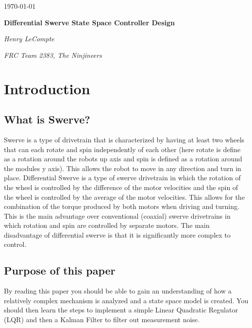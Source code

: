 \documentclass{scrartcl}
\begin{document}
\begin{titlepage}
    \centering
    {\large \today\par}
    \vfill

    {\huge\bfseries Differential Swerve State Space Controller Design\par}
    \vfill

    {\Large\itshape Henry LeCompte}\par
    {\itshape FRC Team 2383, The Ninjineers}\par
    \vspace{1.5cm}

    \vfill
\end{titlepage}

\newpage

\doublespacing
\tableofcontents
\singlespacing

\newpage

\doublespacing

\section{Introduction}
\subsection{What is Swerve?}
Swerve is a type of drivetrain that is characterized by having at least two wheels that can each rotate and spin independently of each other (here rotate is define as a rotation around the robots up axis and spin is defined as a rotation around the modules y axis). This allows the robot to move in any direction and turn in place. Differential Swerve is a type of swerve drivetrain in which the rotation of the wheel is controlled by the difference of the motor velocities and the spin of the wheel is controlled by the average of the motor velocities. This allows for the combination of the torque produced by both motors when driving and turning. This is the main advantage over conventional (coaxial) swerve drivetrains in which rotation and spin are controlled by separate motors. The main disadvantage of differential swerve is that it is significantly more complex to control.

\subsection{Purpose of this paper}
By reading this paper you should be able to gain an understanding of how a relatively complex mechanism is analyzed and a state space model is created. You should then learn the steps to implement a simple Linear Quadratic Regulator (LQR) and then a Kalman Filter to filter out measurement noise.
\end{document}

